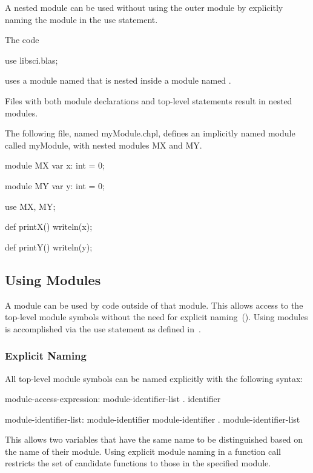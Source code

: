 A nested module can be used without using the outer module by
explicitly naming the module in the use statement.
\begin{example}
The code
\begin{chapel}
use libsci.blas;
\end{chapel}
uses a module named  that is nested inside a module
named .
\end{example}

Files with both module declarations and top-level statements result in
nested modules.

\begin{example}
The following file, named myModule.chpl, defines an
implicitly named module called myModule, with nested modules
MX and MY.
\begin{chapelpre}
\end{chapelpre}
\begin{chapel}
module MX {
  var x: int = 0;
}

module MY {
  var y: int = 0;
}

use MX, MY;

def printX() {
  writeln(x);
}

def printY() {
  writeln(y);
}
\end{chapel}
\begin{chapeloutput}
\end{chapeloutput}
\end{example}


\subsection{Using Modules}
\label{Using_Modules}

A module can be used by code outside of that module.  This allows
access to the top-level module symbols without the need for explicit
naming~().  Using modules is accomplished via
the use statement as defined in~.

\subsubsection{Explicit Naming}
\label{Explicit_Naming}

All top-level module symbols can be named explicitly with the
following syntax:
\begin{syntax}
module-access-expression:
  module-identifier-list . identifier

module-identifier-list:
  module-identifier
  module-identifier . module-identifier-list

\end{syntax}
This allows two variables that have the same name to be distinguished
based on the name of their module.  Using explicit module naming in a
function call restricts the set of candidate functions to those in the
specified module.


